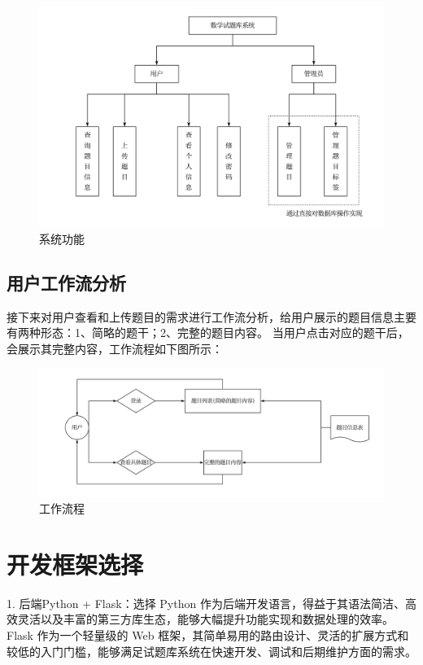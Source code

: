 \documentclass[a4paper,AutoFakeBold={2.7}]{ctexart} %
\begin{document}
\begin{figure}[H]
	\centering
	\includegraphics[width=\linewidth]{./图片/系统功能.pdf}
	\caption{系统功能}\label{系统功能}
\end{figure}

\subsection{用户工作流分析}

接下来对用户查看和上传题目的需求进行工作流分析，给用户展示的题目信息主要有两种形态：1、简略的题干；2、完整的题目内容。
当用户点击对应的题干后，会展示其完整内容，工作流程如下图所示：

\begin{figure}[H]
	\centering
	\includegraphics[width=\linewidth]{./图片/工作流程.pdf}
	\caption{工作流程}\label{工作流程}
\end{figure}

\section{开发框架选择}

1. 后端Python + Flask：选择 Python 作为后端开发语言，得益于其语法简洁、高效灵活以及丰富的第三方库生态，能够大幅提升功能实现和数据处理的效率。Flask 作为一个轻量级的 Web 框架，其简单易用的路由设计、灵活的扩展方式和较低的入门门槛，能够满足试题库系统在快速开发、调试和后期维护方面的需求。
\end{document}
